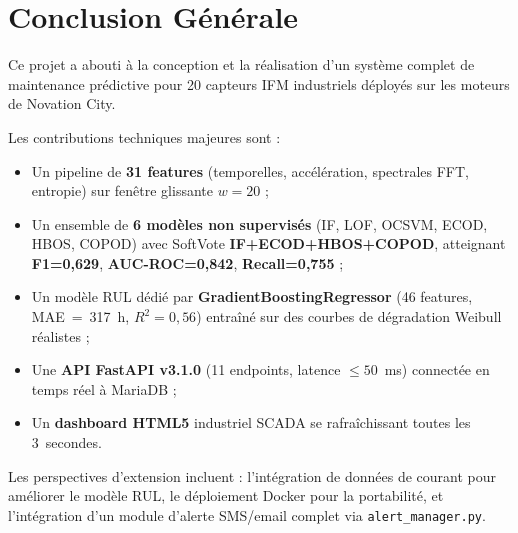 \documentclass[12pt,a4paper]{report}
\begin{document}
\chapter*{Conclusion Générale}

Ce projet a abouti à la conception et la réalisation d'un système complet de
maintenance prédictive pour 20 capteurs IFM industriels déployés sur les moteurs de
Novation City.

Les contributions techniques majeures sont :
\begin{itemize}
  \item Un pipeline de \textbf{31 features} (temporelles, accélération, spectrales FFT, entropie) sur fenêtre glissante $w=20$ ;
  \item Un ensemble de \textbf{6 modèles non supervisés} (IF, LOF, OCSVM, ECOD, HBOS, COPOD) avec SoftVote \textbf{IF+ECOD+HBOS+COPOD}, atteignant \textbf{F1=0,629}, \textbf{AUC-ROC=0,842}, \textbf{Recall=0,755} ;
  \item Un modèle RUL dédié par \textbf{GradientBoostingRegressor} (46 features, MAE~=~317~h, $R^2=0{,}56$) entraîné sur des courbes de dégradation Weibull réalistes ;
  \item Une \textbf{API FastAPI v3.1.0} (11 endpoints, latence $\leq 50$~ms) connectée en temps réel à MariaDB ;
  \item Un \textbf{dashboard HTML5} industriel SCADA se rafraîchissant toutes les 3~secondes.
\end{itemize}

Les perspectives d'extension incluent : l'intégration de données de courant pour
améliorer le modèle RUL, le déploiement Docker pour la portabilité, et l'intégration
d'un module d'alerte SMS/email complet via \texttt{alert\_manager.py}.
\end{document}
